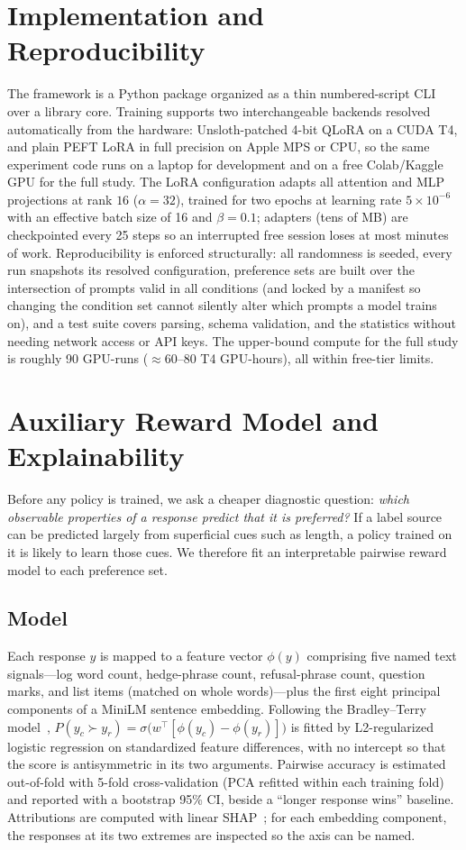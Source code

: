\documentclass[conference]{IEEEtran}
\begin{document}
\section{Implementation and Reproducibility}
The framework is a Python package organized as a thin numbered-script CLI over a
library core. Training supports two interchangeable backends resolved
automatically from the hardware: Unsloth-patched 4-bit QLoRA on a CUDA T4, and
plain PEFT LoRA in full precision on Apple MPS or CPU, so the same experiment code
runs on a laptop for development and on a free Colab/Kaggle GPU for the full
study. The LoRA configuration adapts all attention and MLP projections at rank
$16$ ($\alpha=32$), trained for two epochs at learning rate $5\times10^{-6}$ with
an effective batch size of 16 and $\beta=0.1$; adapters (tens of MB) are
checkpointed every 25 steps so an interrupted free session loses at most minutes
of work. Reproducibility is enforced structurally: all randomness is seeded, every
run snapshots its resolved configuration, preference sets are built over the
intersection of prompts valid in all conditions (and locked by a manifest so
changing the condition set cannot silently alter which prompts a model trains on),
and a test suite covers parsing, schema validation, and the statistics without
needing network access or API keys. The upper-bound compute for the full study is
roughly 90 GPU-runs ($\approx$60--80 T4 GPU-hours), all within free-tier limits.

\section{Auxiliary Reward Model and Explainability}
\label{sec:reward}
Before any policy is trained, we ask a cheaper diagnostic question: \emph{which
observable properties of a response predict that it is preferred?} If a label
source can be predicted largely from superficial cues such as length, a policy
trained on it is likely to learn those cues. We therefore fit an interpretable
pairwise reward model to each preference set.

\subsection{Model}
Each response $y$ is mapped to a feature vector $\phi(y)$ comprising five named
text signals---log word count, hedge-phrase count, refusal-phrase count, question
marks, and list items (matched on whole words)---plus the first eight principal
components of a MiniLM sentence embedding. Following the Bradley--Terry
model~\cite{bradley1952}, $P(y_c \succ y_r)=\sigma\!\big(w^{\top}[\phi(y_c)-\phi(y_r)]\big)$
is fitted by L2-regularized logistic regression on standardized feature
differences, with no intercept so that the score is antisymmetric in its two
arguments. Pairwise accuracy is estimated out-of-fold with 5-fold
cross-validation (PCA refitted within each training fold) and reported with a
bootstrap 95\% CI, beside a ``longer response wins'' baseline. Attributions are
computed with linear SHAP~\cite{lundberg2017shap}; for each embedding component,
the responses at its two extremes are inspected so the axis can be named.
\end{document}
